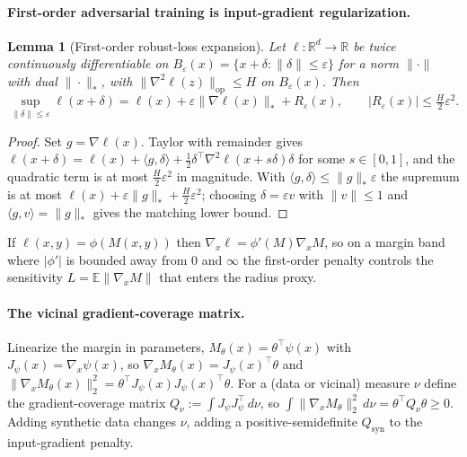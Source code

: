 \documentclass{article}
\newtheorem{lemma}{Lemma}
\theoremstyle{definition}
\newcommand{\R}{\mathbb{R}}
\begin{document}
\paragraph{First-order adversarial training is input-gradient regularization.}
\begin{lemma}[First-order robust-loss expansion]\label{lem:first-order-at}
Let $\ell:\R^d\to\R$ be twice continuously differentiable on $B_\varepsilon(x)=\{x+\delta:\|\delta\|\le\varepsilon\}$ for a norm $\|\cdot\|$ with dual $\|\cdot\|_*$, with $\|\nabla^2\ell(z)\|_{\mathrm{op}}\le H$ on $B_\varepsilon(x)$. Then
\[ \sup_{\|\delta\|\le\varepsilon}\ell(x+\delta)=\ell(x)+\varepsilon\|\nabla\ell(x)\|_*+R_\varepsilon(x),\qquad |R_\varepsilon(x)|\le\tfrac H2\varepsilon^2 . \]
\end{lemma}
\begin{proof}
Set $g=\nabla\ell(x)$. Taylor with remainder gives $\ell(x+\delta)=\ell(x)+\langle g,\delta\rangle+\tfrac12\delta^\top\nabla^2\ell(x+s\delta)\delta$ for some $s\in[0,1]$, and the quadratic term is at most $\tfrac H2\varepsilon^2$ in magnitude. With $\langle g,\delta\rangle\le\|g\|_*\varepsilon$ the supremum is at most $\ell(x)+\varepsilon\|g\|_*+\tfrac H2\varepsilon^2$; choosing $\delta=\varepsilon v$ with $\|v\|\le1$ and $\langle g,v\rangle=\|g\|_*$ gives the matching lower bound.
\end{proof}
If $\ell(x,y)=\phi(M(x,y))$ then $\nabla_x\ell=\phi'(M)\nabla_xM$, so on a margin band where $|\phi'|$ is bounded away from $0$ and $\infty$ the first-order penalty controls the sensitivity $L=\mathbb{E}\|\nabla_xM\|$ that enters the radius proxy.

\paragraph{The vicinal gradient-coverage matrix.}
Linearize the margin in parameters, $M_\theta(x)=\theta^\top\psi(x)$ with $J_\psi(x)=\nabla_x\psi(x)$, so $\nabla_xM_\theta(x)=J_\psi(x)^\top\theta$ and $\|\nabla_xM_\theta(x)\|_2^2=\theta^\top J_\psi(x)J_\psi(x)^\top\theta$. For a (data or vicinal) measure $\nu$ define the gradient-coverage matrix $Q_\nu:=\int J_\psi J_\psi^\top\,d\nu$, so $\int\|\nabla_xM_\theta\|_2^2\,d\nu=\theta^\top Q_\nu\theta\ge0$. Adding synthetic data changes $\nu$, adding a positive-semidefinite $Q_{\mathrm{syn}}$ to the input-gradient penalty.
\end{document}
